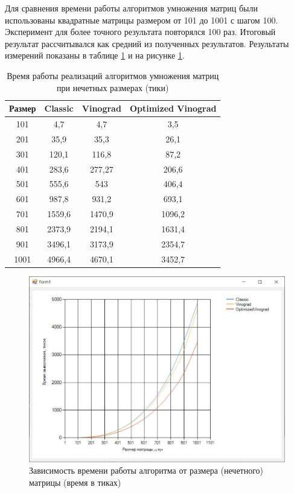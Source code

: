Для сравнения времени работы алгоритмов умножения матриц были использованы квадратные матрицы размером от 101 до 1001 с шагом 100. Эксперимент для более точного результата повторялся 100 раз. Итоговый результат рассчитывался как средний из полученных результатов. Результаты измерений показаны в таблице \ref{tbl:odd} и на рисунке \ref{fig:odd}.
\captionsetup{justification=raggedright,singlelinecheck=false}
\begin{table}[H]
	\begin{center}
		\caption{Время работы реализаций алгоритмов умножения матриц при нечетных размерах (тики)}
		\label{tbl:odd}
		\begin{tabular}{|c|c|c|c|}
			\hline
			Размер & Classic &  Vinograd &  Optimized Vinograd \\
			\hline
			101&	4,7&	4,7&	3,5\\
			\hline
			201&	35,9&	35,3&	26,1\\
			\hline
			301&	120,1&	116,8&	87,2\\
			\hline
			401&	283,6&	277,27&	206,6\\
			\hline
			501&	555,6&	543&	406,4\\
			\hline
			601&	987,8&	931,2&	693,1\\
			\hline
			701&	1559,6&	1470,9&	1096,2\\
			\hline
			801&	2373,9&	2194,1&	1631,4\\
			\hline
			901&	3496,1&	3173,9&	2354,7\\
			\hline
			1001&	4966,4&	4670,1&	3452,7\\
			\hline
		\end{tabular}
	\end{center}
	
\end{table}

\captionsetup{justification=centering, singlelinecheck=false}

\begin{figure}[H]
	\centering
	\includegraphics[width=1\linewidth]{"inc/img/Снимок экрана 2022-10-20 011917"}
	\caption{Зависимость времени работы алгоритма от размера (нечетного) матрицы (время в тиках)}
	\label{fig:odd}
\end{figure}

